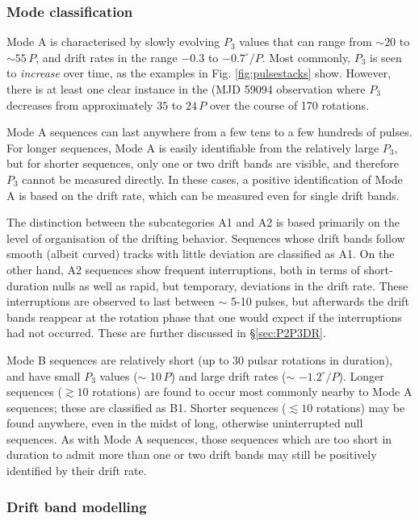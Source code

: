 \documentclass[twocolumn]{aastex631}
\begin{document}
\subsubsection{Mode classification}

Mode A is characterised by slowly evolving $P_3$ values that can range from $\sim20$ to $\sim55\,P$, and drift rates in the range $-0.3$ to $-0.7^\circ/P$.
Most commonly, $P_3$ is seen to \textit{increase} over time, as the examples in Fig. \ref{fig:pulsestacks} show.
However, there is at least one clear instance in the (MJD 59094 observation where $P_3$ decreases from approximately $35$ to $24\,P$ over the course of 170 rotations.

Mode A sequences can last anywhere from a few tens to a few hundreds of pulses.
For longer sequences, Mode A is easily identifiable from the relatively large $P_3$, but for shorter sequences, only one or two drift bands are visible, and therefore $P_3$ cannot be measured directly.
In these cases, a positive identification of Mode A is based on the drift rate, which can be measured even for single drift bands.

The distinction between the subcategories A1 and A2 is based primarily on the level of organisation of the drifting behavior.
Sequences whose drift bands follow smooth (albeit curved) tracks with little deviation are classified as A1.
On the other hand, A2 sequences show frequent interruptions, both in terms of short-duration nulls as well as rapid, but temporary, deviations in the drift rate.
These interruptions are observed to last between $\sim$ 5-10 pulses, but afterwards the drift bands reappear at the rotation phase that one would expect if the interruptions had not occurred.
These are further discussed in \S\ref{sec:P2P3DR}.

Mode B sequences are relatively short (up to 30 pulsar rotations in duration), and have small $P_3$ values ($\sim$ 10\,$P$) and large drift rates ($\sim$ $-1.2^\circ/P$).
Longer sequences ($\gtrsim 10$ rotations) are found to occur most commonly nearby to Mode A sequences; these are classified as B1.
Shorter sequences ($\lesssim 10$ rotations) may be found anywhere, even in the midst of long, otherwise uninterrupted null sequences.
As with Mode A sequences, those sequences which are too short in duration to admit more than one or two drift bands may still be positively identified by their drift rate.

\subsubsection{Drift band modelling}
\end{document}
